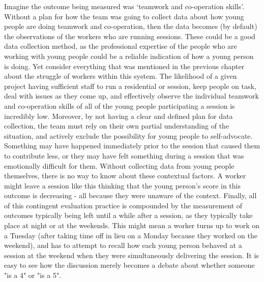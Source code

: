 Imagine the outcome being measured was `teamwork and co-operation skills'. Without a plan for how the team was going to collect data about how young people are doing teamwork and co-operation, then the data becomes (by default) the observations of the workers who are running sessions. These could be a good data collection method, as the professional expertise of the people who are working with young people could be a reliable indication of how a young person is doing. Yet consider everything that was mentioned in the previous chapter about the struggle of workers within this system. The likelihood of a given project having sufficient staff to run a residential or session, keep people on task, deal with issues as they come up, and effectively observe the individual teamwork and co-operation skills of all of the young people participating a session is incredibly low. Moreover, by not having a clear and defined plan for data collection, the team must rely on their own partial understanding of the situation, and actively exclude the possibility for young people to self-advocate. Something may have happened immediately prior to the session that caused them to contribute less, or they may have felt something during a session that was emotionally difficult for them. Without collecting data from young people themselves, there is no way to know about these contextual factors. A worker might leave a session like this thinking that the young person's score in this outcome is decreasing - all because they were unaware of the context. Finally, all of this contingent evaluation practice is compounded by the measurement of outcomes typically being left until a while after a session, as they typically take place at night or at the weekends. This might mean a worker turns up to work on a Tuesday (after taking time off in lieu on a Monday because they worked on the weekend), and has to attempt to recall how each young person behaved at a session at the weekend when they were simultaneously delivering the session. It is easy to see how the discussion merely becomes a debate about whether someone "is a 4" or "is a 5". 

